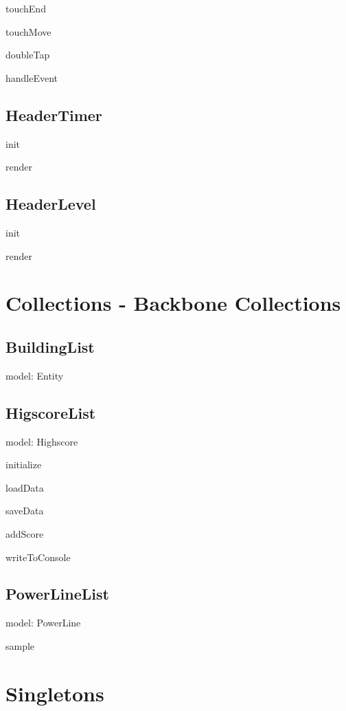   	touchEnd

  	touchMove

  	doubleTap

  	handleEvent

\subsection*{HeaderTimer}

	init

	render

\subsection*{HeaderLevel}

	init

	render

\clearpage

\section{Collections - Backbone Collections}
	
\subsection*{BuildingList}

	model: Entity

\subsection*{HigscoreList}
	
	model: Highscore

	initialize

	loadData

	saveData

	addScore

	writeToConsole

\subsection*{PowerLineList}

	model: PowerLine

	sample

\clearpage

\section{Singletons}

